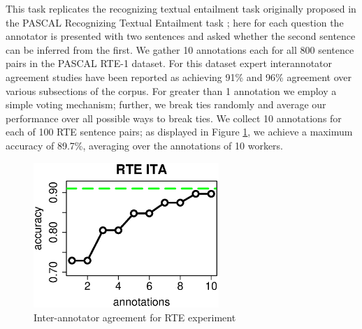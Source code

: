 \documentclass[11pt]{article}
\begin{document}
This task replicates the recognizing textual entailment task originally proposed in the PASCAL Recognizing Textual Entailment task \cite{rte1}; here for each question the annotator is presented with two sentences and asked whether the second sentence can be inferred from the first.  We gather 10 annotations each for all 800 sentence pairs in the PASCAL RTE-1 dataset.  For this dataset expert interannotator agreement studies have been reported as achieving 91\% and 96\% agreement over various subsections of the corpus.  For greater than 1 annotation we employ a simple voting mechanism;  further, we break ties randomly and average our performance over all possible ways to break ties.  We collect 10 annotations for each of 100 RTE sentence pairs; as displayed in Figure \ref{rteITA}, we achieve a maximum accuracy of 89.7\%, averaging over the annotations of 10 workers. %
\begin{figure}[ht]
\centering
\includegraphics[width=7cm]{figures/rte.eps}
\caption{Inter-annotator agreement for RTE experiment } \label{rteITA}
\end{figure}


\end{document}
